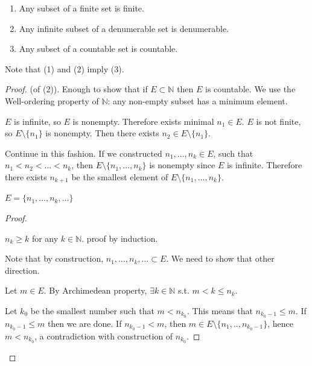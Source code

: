 \begin{proposition}
	\begin{enumerate}
		\item Any subset of a finite set is finite.
		\item Any infinite subset of a denumerable set is denumerable.
		\item Any subset of a countable set is countable.
	\end{enumerate}
	Note that (1) and (2) imply (3).
\end{proposition}
\begin{proof}
	(of (2)). Enough to show that if $E \subset \mathbb{N}$ then $E$ is countable. We use the Well-ordering property of $\mathbb{N}$: any non-empty subset has a minimum element.

	$E$ is infinite, so $E$ is nonempty. Therefore exists minimal $n_1 \in E$. $E$ is not finite, so $E \setminus \{n_1\} $ is nonempty. Then there exists $n_2 \in E \setminus \{n_1\} $.

	Continue in this fashion. If we constructed $n_1, \ldots, n_k \in E$, such that $n_1 < n_2 <\ldots<n_k$, then $E\setminus \{n_1, \ldots, n_k\} $ is nonempty since $E$ is infinite. Therefore there exists $n_{k+1}$ be the smallest element of $E\setminus \{n_1, \ldots, n_k\} $.

\begin{claim}
	$E = \{n_1, \ldots, n_k, \ldots\} $
\end{claim}
\begin{proof}


\begin{lemma}
	$n_k \ge k$ for any $k \in \mathbb{N}$.
	proof by induction.
\end{lemma}

Note that by construction, $n_1, \ldots, n_k, \ldots \subset E$. We need to show that other direction.

Let $m \in E$. By Archimedean property, $\exists k \in \mathbb{N}$ s.t. $m<k\le n_k$.

Let $k_0$ be the smallest number such that  $m < n_{k_0}$. This means that $n_{k_0-1}\le m$. If $n_{k_0-1}\le m$ then we are done. If $n_{k_0-1}< m$, then $m \in E\setminus \{n_1, .., n_{k_{0}-1}\} $, hence $m < n_{k_0}$, a contradiction with construction of $n_{k_0}$.
\end{proof}
\end{proof}

